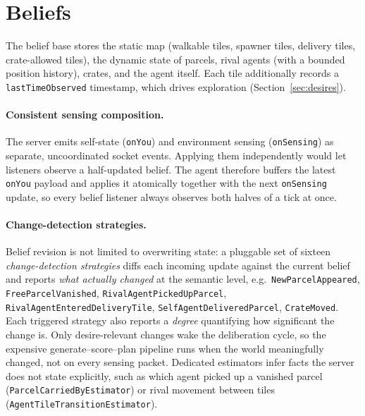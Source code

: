 \section{Beliefs}
\label{sec:beliefs}

The belief base stores the static map (walkable tiles, spawner tiles, delivery tiles,
crate-allowed tiles), the dynamic state of parcels, rival agents (with a bounded position
history), crates, and the agent itself. Each tile additionally records a
\texttt{lastTimeObserved} timestamp, which drives exploration (Section~\ref{sec:desires}).

\paragraph{Consistent sensing composition.} The server emits self-state (\texttt{onYou}) and
environment sensing (\texttt{onSensing}) as separate, uncoordinated socket events. Applying them
independently would let listeners observe a half-updated belief. The agent therefore buffers the
latest \texttt{onYou} payload and applies it atomically together with the next
\texttt{onSensing} update, so every belief listener always observes both halves of a tick at
once.

\paragraph{Change-detection strategies.} Belief revision is not limited to overwriting state:
a pluggable set of sixteen \emph{change-detection strategies} diffs each incoming update against
the current belief and reports \emph{what actually changed} at the semantic level, e.g.\
\texttt{NewParcelAppeared}, \texttt{FreeParcelVanished}, \texttt{RivalAgentPickedUpParcel},
\texttt{RivalAgentEnteredDeliveryTile}, \texttt{SelfAgentDeliveredParcel},
\texttt{CrateMoved}. Each triggered strategy also reports a \emph{degree} quantifying how
significant the change is. Only desire-relevant changes wake the deliberation cycle, so the
expensive generate--score--plan pipeline runs when the world meaningfully changed, not on every
sensing packet. Dedicated estimators infer facts the server does not state explicitly, such as
which agent picked up a vanished parcel (\texttt{ParcelCarriedByEstimator}) or rival movement
between tiles (\texttt{AgentTileTransitionEstimator}).
